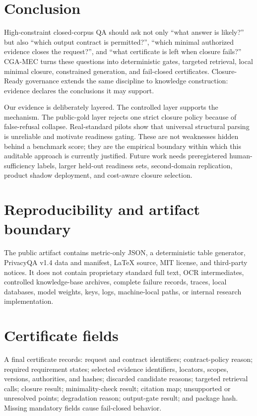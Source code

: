 \documentclass[11pt]{article}
\newcommand{\method}{CGA-MEC}
\begin{document}
\section{Conclusion}
\label{sec:conclusion}

High-constraint closed-corpus QA should ask not only ``what answer is likely?'' but also ``which output contract is permitted?'', ``which minimal authorized evidence closes the request?'', and ``what certificate is left when closure fails?'' \method{} turns these questions into deterministic gates, targeted retrieval, local minimal closure, constrained generation, and fail-closed certificates. Closure-Ready governance extends the same discipline to knowledge construction: evidence declares the conclusions it may support.

Our evidence is deliberately layered. The controlled layer supports the mechanism. The public-gold layer rejects one strict closure policy because of false-refusal collapse. Real-standard pilots show that universal structural parsing is unreliable and motivate readiness gating. These are not weaknesses hidden behind a benchmark score; they are the empirical boundary within which this auditable approach is currently justified. Future work needs preregistered human-sufficiency labels, larger held-out readiness sets, second-domain replication, product shadow deployment, and cost-aware closure selection.




\appendix

\section{Reproducibility and artifact boundary}
\label{app:repro}

The public artifact contains metric-only JSON, a deterministic table generator, PrivacyQA v1.4 data and manifest, LaTeX source, MIT license, and third-party notices. It does not contain proprietary standard full text, OCR intermediates, controlled knowledge-base archives, complete failure records, traces, local databases, model weights, keys, logs, machine-local paths, or internal research implementation.

\section{Certificate fields}
\label{app:certificate}

A final certificate records: request and contract identifiers; contract-policy reason; required requirement states; selected evidence identifiers, locators, scopes, versions, authorities, and hashes; discarded candidate reasons; targeted retrieval calls; closure result; minimality-check result; citation map; unsupported or unresolved points; degradation reason; output-gate result; and package hash. Missing mandatory fields cause fail-closed behavior.
\end{document}
